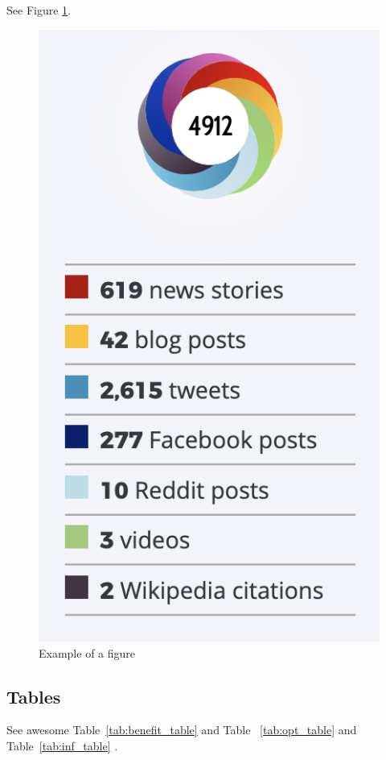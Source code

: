 \documentclass{article}
\begin{document}
See Figure \ref{fig:altmetric}.

\begin{figure} %
    \centering
    \includegraphics{altmetric.png}
    \caption{Example of a figure}
    \label{fig:altmetric}
\end{figure}

\subsection{Tables}

See awesome Table~\ref{tab:benefit_table}  and Table ~\ref{tab:opt_table} and Table~\ref{tab:inf_table} .
\renewcommand{\arraystretch}{1.1} %
\end{document}
